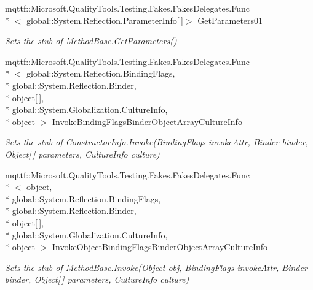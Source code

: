 \begin{DoxyCompactItemize}
mqttf\-::\-Microsoft.\-Quality\-Tools.\-Testing.\-Fakes.\-Fakes\-Delegates.\-Func\\*
$<$ global\-::\-System.\-Reflection.\-Parameter\-Info\mbox{[}$\,$\mbox{]}$>$ \hyperlink{class_system_1_1_reflection_1_1_fakes_1_1_stub_constructor_info_a24b614ed1d8670ff0a151217a9115212}{Get\-Parameters01}
\begin{DoxyCompactList}\small\item\em Sets the stub of Method\-Base.\-Get\-Parameters()\end{DoxyCompactList}\item 
mqttf\-::\-Microsoft.\-Quality\-Tools.\-Testing.\-Fakes.\-Fakes\-Delegates.\-Func\\*
$<$ global\-::\-System.\-Reflection.\-Binding\-Flags, \\*
global\-::\-System.\-Reflection.\-Binder, \\*
object\mbox{[}$\,$\mbox{]}, \\*
global\-::\-System.\-Globalization.\-Culture\-Info, \\*
object $>$ \hyperlink{class_system_1_1_reflection_1_1_fakes_1_1_stub_constructor_info_a55fff90ebf29c468127a06d5ea95b544}{Invoke\-Binding\-Flags\-Binder\-Object\-Array\-Culture\-Info}
\begin{DoxyCompactList}\small\item\em Sets the stub of Constructor\-Info.\-Invoke(\-Binding\-Flags invoke\-Attr, Binder binder, Object\mbox{[}$\,$\mbox{]} parameters, Culture\-Info culture)\end{DoxyCompactList}\item 
mqttf\-::\-Microsoft.\-Quality\-Tools.\-Testing.\-Fakes.\-Fakes\-Delegates.\-Func\\*
$<$ object, \\*
global\-::\-System.\-Reflection.\-Binding\-Flags, \\*
global\-::\-System.\-Reflection.\-Binder, \\*
object\mbox{[}$\,$\mbox{]}, \\*
global\-::\-System.\-Globalization.\-Culture\-Info, \\*
object $>$ \hyperlink{class_system_1_1_reflection_1_1_fakes_1_1_stub_constructor_info_a739c56b31cbe11df7168976c80542ca6}{Invoke\-Object\-Binding\-Flags\-Binder\-Object\-Array\-Culture\-Info}
\begin{DoxyCompactList}\small\item\em Sets the stub of Method\-Base.\-Invoke(\-Object obj, Binding\-Flags invoke\-Attr, Binder binder, Object\mbox{[}$\,$\mbox{]} parameters, Culture\-Info culture)\end{DoxyCompactList}\item 

\end{DoxyCompactItemize}
